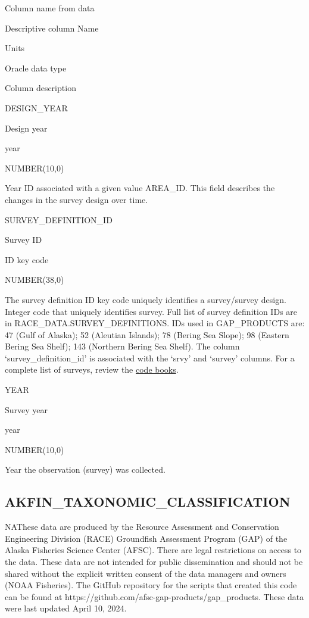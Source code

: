 \documentclass[
  letterpaper,
  oneside,
  open=any]{scrbook}
\begin{document}
Column name from data

Descriptive column Name

Units

Oracle data type

Column description

DESIGN\_YEAR

Design year

year

NUMBER(10,0)

Year ID associated with a given value AREA\_ID. This field describes the
changes in the survey design over time.

SURVEY\_DEFINITION\_ID

Survey ID

ID key code

NUMBER(38,0)

The survey definition ID key code uniquely identifies a survey/survey
design. Integer code that uniquely identifies survey. Full list of
survey definition IDs are in RACE\_DATA.SURVEY\_DEFINITIONS. IDs used in
GAP\_PRODUCTS are: 47 (Gulf of Alaska); 52 (Aleutian Islands); 78
(Bering Sea Slope); 98 (Eastern Bering Sea Shelf); 143 (Northern Bering
Sea Shelf). The column `survey\_definition\_id' is associated with the
`srvy' and `survey' columns. For a complete list of surveys, review the
\href{https://www.fisheries.noaa.gov/resource/document/groundfish-survey-species-code-manual-and-data-codes-manual}{code
books}.

YEAR

Survey year

year

NUMBER(10,0)

Year the observation (survey) was collected.

\hypertarget{akfin_taxonomic_classification}{%
\subsection{AKFIN\_TAXONOMIC\_CLASSIFICATION}\label{akfin_taxonomic_classification}}

NAThese data are produced by the Resource Assessment and Conservation
Engineering Division (RACE) Groundfish Assessment Program (GAP) of the
Alaska Fisheries Science Center (AFSC). There are legal restrictions on
access to the data. These data are not intended for public dissemination
and should not be shared without the explicit written consent of the
data managers and owners (NOAA Fisheries). The GitHub repository for the
scripts that created this code can be found at
https://github.com/afsc-gap-products/gap\_products. These data were last
updated April 10, 2024.
\end{document}
